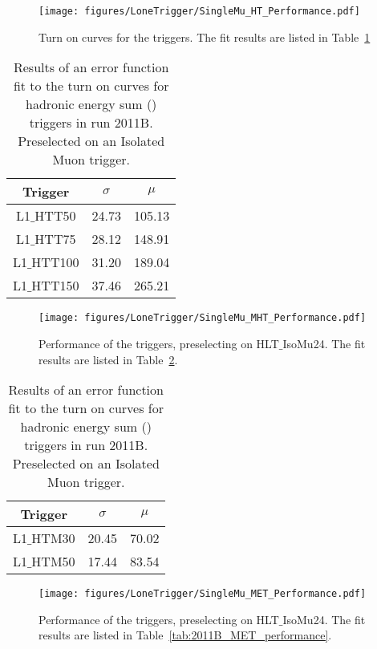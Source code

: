 \begin{figure}[ht]
  \centering
    \texttt{[image: figures/LoneTrigger/SingleMu\_HT\_Performance.pdf]}
  \caption{Turn on curves for the \Lone \HT triggers. The fit results are listed in Table~\ref{tab:2011B_HT_performance}}
  \label{fig:figures_SingleMu_HT_Performance}
\end{figure}

\begin{table}[ht]
 \centering
\begin{tabular}{|c|c|c|}
\hline
\hline
Trigger & $\sigma$ & $\mu$\\
\hline
L1$\_$HTT50 & 24.73 & 105.13 \\
\hline
L1$\_$HTT75 & 28.12 & 148.91 \\
\hline
L1$\_$HTT100 & 31.20 & 189.04 \\
\hline
L1$\_$HTT150 & 37.46 & 265.21 \\
\hline
\hline
\end{tabular}
\caption{Results of an error function fit to the turn on curves for \Lone 
hadronic energy sum (\HT) triggers in run 2011B. Preselected on an Isolated Muon trigger.}
\label{tab:2011B_HT_performance}
\end{table}


\begin{figure}[ht]
  \centering
    \texttt{[image: figures/LoneTrigger/SingleMu\_MHT\_Performance.pdf]}
  \caption{Performance of the \Lone \HTm triggers, preselecting on 
  HLT$\_$IsoMu24. The fit results are listed in 
  Table~\ref{tab:2011B_HTM_performance}. }
  \label{fig:figures_SingleMu_MHT_Performance}
\end{figure}

  
\begin{table}[ht]
 \centering
\begin{tabular}{|c|c|c|}
\hline
\hline
Trigger & $\sigma$ & $\mu$\\
\hline
L1$\_$HTM30 & 20.45 & 70.02 \\
\hline
L1$\_$HTM50 & 17.44 & 83.54 \\
\hline
\hline
\end{tabular}
\caption{Results of an error function fit to the turn on curves for \Lone 
hadronic energy sum (\HTm) triggers in run 2011B. Preselected on an Isolated Muon trigger.}
\label{tab:2011B_HTM_performance}
\end{table}

\begin{figure}[ht]
  \centering
    \texttt{[image: figures/LoneTrigger/SingleMu\_MET\_Performance.pdf]}
  \caption{Performance of the \Lone \MET triggers, preselecting on 
  HLT$\_$IsoMu24. The fit results are listed in 
  Table~\ref{tab:2011B_MET_performance}.}
  \label{fig:figures_SingleMu_MET_Performance}
\end{figure}


